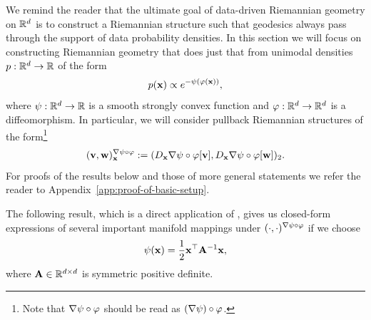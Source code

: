 We remind the reader that the ultimate goal of data-driven Riemannian geometry on $\mathbb{R}^d$ is to construct a Riemannian structure such that geodesics always pass through the support of data probability densities. In this section we will focus on constructing Riemannian geometry that does just that from unimodal densities $p:\mathbb{R}^d\to \mathbb{R}$ of the form
\begin{equation}
    p(\mathbf{x}) \propto e^{- \psi(\varphi(\mathbf{x}))},
    \label{eq:stroco-diffeo-density}
\end{equation}
where $\psi:\mathbb{R}^d\to\mathbb{R}$ is a smooth strongly convex function and $\varphi:\mathbb{R}^d\to\mathbb{R}^d$ is a diffeomorphism.
In particular, we will consider pullback Riemannian structures of the form\footnote{Note that $\nabla \psi \circ \varphi$ should be read as $(\nabla \psi) \circ \varphi$.}
\begin{equation}
    (\mathbf{v}, \mathbf{w})^{\nabla \psi \circ \varphi}_{\mathbf{x}} := (D_{\mathbf{x}} \nabla \psi \circ \varphi[\mathbf{v}], D_{\mathbf{x}} \nabla \psi \circ \varphi[\mathbf{w}])_2.
    \label{eq:stroco-diffeo-pullback}
\end{equation}
For proofs of the results below and those of more general statements we refer the reader to Appendix~\ref{app:proof-of-basic-setup}.


The following result, which is a direct application of \cite[Prop.~2.1]{diepeveen2024pulling}, gives us closed-form expressions of several important manifold mappings under $(\cdot,\cdot)^{\nabla \psi \circ \varphi}$ if we choose
\begin{equation}
    \psi(\mathbf{x})=\frac{1}{2} \mathbf{x}^{\top} \mathbf{A}^{-1} \mathbf{x},
    \label{eq:quadratic-stroco}
\end{equation}
where $\mathbf{A}\in \mathbb{R}^{d\times d}$ is symmetric positive definite.

